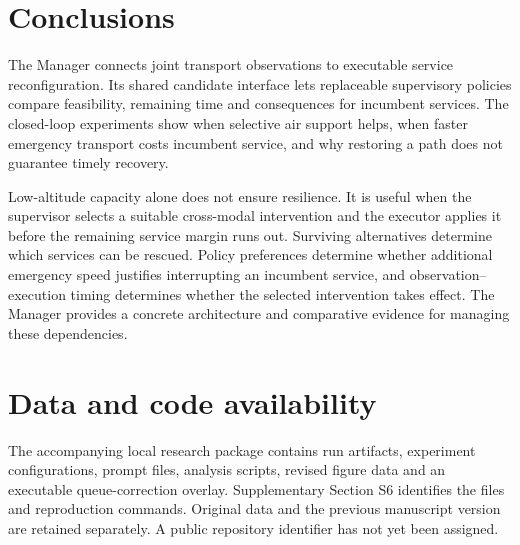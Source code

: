 \documentclass[]{interact}
\theoremstyle{plain}
\theoremstyle{definition}
\theoremstyle{remark}
\begin{document}
\section{Conclusions}

The Manager connects joint transport observations to executable service reconfiguration. Its shared candidate interface lets replaceable supervisory policies compare feasibility, remaining time and consequences for incumbent services. The closed-loop experiments show when selective air support helps, when faster emergency transport costs incumbent service, and why restoring a path does not guarantee timely recovery.

Low-altitude capacity alone does not ensure resilience. It is useful when the supervisor selects a suitable cross-modal intervention and the executor applies it before the remaining service margin runs out. Surviving alternatives determine which services can be rescued. Policy preferences determine whether additional emergency speed justifies interrupting an incumbent service, and observation--execution timing determines whether the selected intervention takes effect. The Manager provides a concrete architecture and comparative evidence for managing these dependencies.

\section*{Data and code availability}

The accompanying local research package contains run artifacts, experiment configurations, prompt files, analysis scripts, revised figure data and an executable queue-correction overlay. Supplementary Section S6 identifies the files and reproduction commands. Original data and the previous manuscript version are retained separately. A public repository identifier has not yet been assigned.



\end{document}

